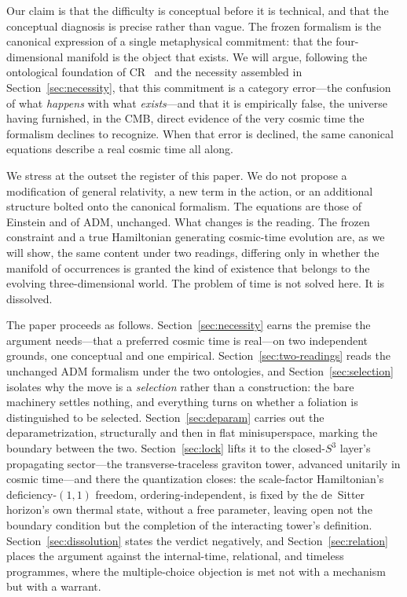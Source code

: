 \documentclass[11pt,a4paper]{article}
\theoremstyle{plain}
\theoremstyle{definition}
\theoremstyle{remark}
\begin{document}
Our claim is that the difficulty is conceptual before it is technical, and that the conceptual diagnosis is precise rather than vague. The frozen formalism is the canonical expression of a single metaphysical commitment: that the four-dimensional manifold is the object that exists. We will argue, following the ontological foundation of CR~\cite{Janzen2025, JanzenCRframework} and the necessity assembled in Section~\ref{sec:necessity}, that this commitment is a category error---the confusion of what \emph{happens} with what \emph{exists}---and that it is empirically false, the universe having furnished, in the CMB, direct evidence of the very cosmic time the formalism declines to recognize. When that error is declined, the same canonical equations describe a real cosmic time all along.

We stress at the outset the register of this paper. We do not propose a modification of general relativity, a new term in the action, or an additional structure bolted onto the canonical formalism. The equations are those of Einstein and of ADM, unchanged. What changes is the reading. The frozen constraint and a true Hamiltonian generating cosmic-time evolution are, as we will show, the same content under two readings, differing only in whether the manifold of occurrences is granted the kind of existence that belongs to the evolving three-dimensional world. The problem of time is not solved here. It is dissolved.

The paper proceeds as follows. Section~\ref{sec:necessity} earns the premise the argument needs---that a preferred cosmic time is real---on two independent grounds, one conceptual and one empirical. Section~\ref{sec:two-readings} reads the unchanged ADM formalism under the two ontologies, and Section~\ref{sec:selection} isolates why the move is a \emph{selection} rather than a construction: the bare machinery settles nothing, and everything turns on whether a foliation is distinguished to be selected. Section~\ref{sec:deparam} carries out the deparametrization, structurally and then in flat minisuperspace, marking the boundary between the two. Section~\ref{sec:lock} lifts it to the closed-$S^3$ layer's propagating sector---the transverse-traceless graviton tower, advanced unitarily in cosmic time---and there the quantization closes: the scale-factor Hamiltonian's deficiency-$(1,1)$ freedom, ordering-independent, is fixed by the de~Sitter horizon's own thermal state, without a free parameter, leaving open not the boundary condition but the completion of the interacting tower's definition. Section~\ref{sec:dissolution} states the verdict negatively, and Section~\ref{sec:relation} places the argument against the internal-time, relational, and timeless programmes, where the multiple-choice objection is met not with a mechanism but with a warrant.
\end{document}
